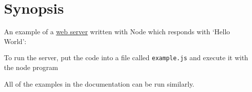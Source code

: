 \section{Synopsis}

An example of a \href{http.html}{web server} written with Node which
responds with `Hello World':

\begin{Shaded}
\begin{Highlighting}[]
 \NormalTok{);}

\NormalTok{(} 
  \NormalTok{(}\NormalTok{, \{}\NormalTok{: }\NormalTok{\});}
  \NormalTok{(}\NormalTok{);}
\NormalTok{(}\NormalTok{);}

\NormalTok{(}\NormalTok{);}
\end{Highlighting}
\end{Shaded}

To run the server, put the code into a file called \texttt{example.js}
and execute it with the node program

\begin{Shaded}
\begin{Highlighting}[]
 \NormalTok{:}
\end{Highlighting}
\end{Shaded}

All of the examples in the documentation can be run similarly.

